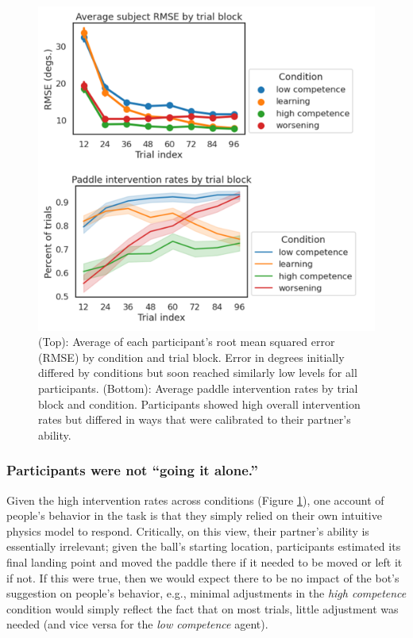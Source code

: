 \documentclass[10pt,letterpaper]{article}
\begin{document}
\begin{figure}[H]
\begin{center}
\includegraphics[width=\linewidth]{img/results-summary.png}
\end{center}
\caption{(Top): Average of each participant's root mean squared error (RMSE) by condition and trial block. Error in degrees initially differed by conditions but soon reached similarly low levels for all participants. (Bottom): Average paddle intervention rates by trial block and condition. Participants showed high overall intervention rates but differed in ways that were calibrated to their partner's ability.} 
\label{fig:rmse}
\end{figure}


\subsubsection{Participants were not ``going it alone.''}

Given the high intervention rates across conditions (Figure \ref{fig:rmse}), one account of people's behavior in the task is that they simply relied on their own intuitive physics model to respond. Critically, on this view, their partner's ability is essentially irrelevant; given the ball's starting location, participants estimated its final landing point and moved the paddle there if it needed to be moved or left it if not. If this were true, then we would expect there to be no impact of the bot's suggestion on people's behavior, e.g., minimal adjustments in the \textit{high competence} condition would simply reflect the fact that on most trials, little adjustment was needed (and vice versa for the \textit{low competence} agent). 
\end{document}
